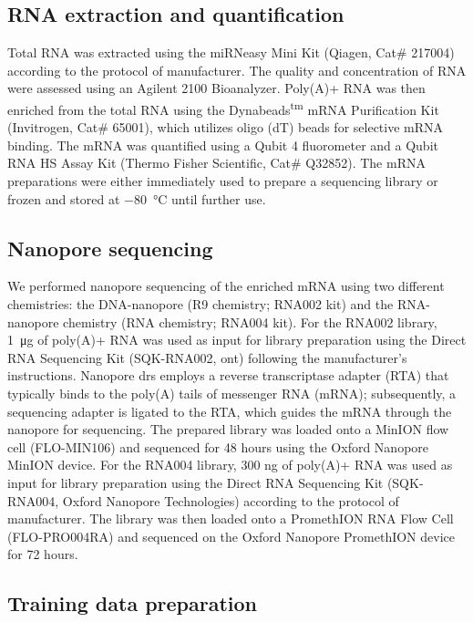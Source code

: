 \documentclass[pdflatex, sn-mathphys-num, lineno]{sn-jnl}%
\theoremstyle{thmstyleone}%
\theoremstyle{thmstyletwo}%
\theoremstyle{thmstylethree}%
\begin{document}
\subsection{RNA extraction and quantification}

Total RNA was extracted using the miRNeasy Mini Kit (Qiagen, Cat\# 217004) according to the protocol of manufacturer.
The quality and concentration of RNA were assessed using an Agilent 2100 Bioanalyzer.
Poly(A)+ RNA was then enriched from the total RNA using the Dynabeads\textsuperscript{tm} mRNA Purification Kit (Invitrogen, Cat\# 65001), which utilizes oligo (dT) beads for selective mRNA binding.
The mRNA was quantified using a Qubit 4 fluorometer and a Qubit RNA HS Assay Kit (Thermo Fisher Scientific, Cat\# Q32852).
The mRNA preparations were either immediately used to prepare a sequencing library or frozen and stored at \SI{-80}{\degreeCelsius} until further use.

\subsection{Nanopore sequencing}

We performed nanopore sequencing of the enriched mRNA using two different chemistries: the DNA-nanopore (R9 chemistry; RNA002 kit) and the RNA-nanopore chemistry (RNA chemistry; RNA004 kit).
For the RNA002 library, \SI{1}{\micro\gram} of poly(A)+ RNA was used as input for library preparation using the Direct RNA Sequencing Kit (SQK-RNA002, \gls{ont}) following the manufacturer's instructions.
Nanopore \gls{drs} employs a reverse transcriptase adapter (RTA) that typically binds to the poly(A) tails of messenger RNA (mRNA); subsequently, a sequencing adapter is ligated to the RTA, which guides the mRNA through the nanopore for sequencing.
The prepared library was loaded onto a MinION flow cell (FLO-MIN106) and sequenced for 48 hours using the Oxford Nanopore MinION device.
For the RNA004 library, 300 ng of poly(A)+ RNA was used as input for library preparation using the Direct RNA Sequencing Kit (SQK-RNA004, Oxford Nanopore Technologies) according to the protocol of manufacturer.
The library was then loaded onto a PromethION RNA Flow Cell (FLO-PRO004RA) and sequenced on the Oxford Nanopore PromethION device for 72 hours.

\subsection{Training data preparation}\label{ssec:data}
\end{document}
